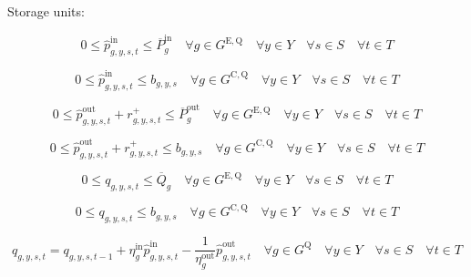 \documentclass{article}
\newcommand{\sStorage}{G^{\mathrm{Q}}}
\newcommand{\sStorageExisting}{G^{\mathrm{E,Q}}}
\newcommand{\sStorageCandidate}{G^{\mathrm{C,Q}}}
\newcommand{\sYears}{Y}
\newcommand{\sScenarios}{S}
\newcommand{\sIntervals}{T}
\newcommand{\iGenerator}{g}
\newcommand{\iYear}{y}
\newcommand{\iScenario}{s}
\newcommand{\iInterval}{t}
\newcommand{\cPowerChargingMax}[1][\iGenerator]{\overline{P}^{\mathrm{in}}_{#1}}
\newcommand{\cPowerDischargingMax}[1][\iGenerator]{\overline{P}^{\mathrm{out}}_{#1}}
\newcommand{\cStorageUnitEnergyMax}[1][\iGenerator]{\overline{Q}_{#1}}
\newcommand{\cStorageUnitEfficiencyCharging}{\eta_{\iGenerator}^{\mathrm{in}}}
\newcommand{\cStorageUnitEfficiencyDischarging}{\eta_{\iGenerator}^{\mathrm{out}}}
\newcommand{\vReserveUp}[1][\iGenerator,\iYear,\iScenario,\iInterval]{r^{+}_{#1}}
\newcommand{\vPowerTotalIn}[1][\iGenerator,\iYear,\iScenario,\iInterval]{\hat{p}^{\mathrm{in}}_{#1}}
\newcommand{\vPowerTotalOut}[1][\iGenerator,\iYear,\iScenario,\iInterval]{\hat{p}^{\mathrm{out}}_{#1}}
\newcommand{\vStorageUnitEnergy}[1][\iGenerator,\iYear,\iScenario,\iInterval]{q_{#1}}
\newcommand{\vInstalledCapacityTotalScenario}[1][\iGenerator,\iYear,\iScenario]{b_{#1}}
\begin{document}
Storage units:

\begin{equation}
0 \leq \vPowerTotalIn \leq \cPowerChargingMax \quad \forall \iGenerator \in \sStorageExisting \quad \forall \iYear \in \sYears \quad \forall \iScenario \in \sScenarios \quad \forall \iInterval \in \sIntervals
\end{equation}

\begin{equation}
0 \leq \vPowerTotalIn \leq \vInstalledCapacityTotalScenario \quad \forall \iGenerator \in \sStorageCandidate \quad \forall \iYear \in \sYears \quad \forall \iScenario \in \sScenarios \quad \forall \iInterval \in \sIntervals
\end{equation}

\begin{equation}
0 \leq \vPowerTotalOut + \vReserveUp \leq \cPowerDischargingMax \quad \forall \iGenerator \in \sStorageExisting \quad \forall \iYear \in \sYears \quad \forall \iScenario \in \sScenarios \quad \forall \iInterval \in \sIntervals
\end{equation}

\begin{equation}
0 \leq \vPowerTotalOut + \vReserveUp \leq \vInstalledCapacityTotalScenario \quad \forall \iGenerator \in \sStorageCandidate \quad \forall \iYear \in \sYears \quad \forall \iScenario \in \sScenarios \quad \forall \iInterval \in \sIntervals
\end{equation}

\begin{equation}
0 \leq \vStorageUnitEnergy \leq \cStorageUnitEnergyMax \quad \forall \iGenerator \in \sStorageExisting \quad \forall \iYear \in \sYears \quad \forall \iScenario \in \sScenarios \quad \forall \iInterval \in \sIntervals
\end{equation}

\begin{equation}
0 \leq \vStorageUnitEnergy \leq \vInstalledCapacityTotalScenario \quad \forall \iGenerator \in \sStorageCandidate \quad \forall \iYear \in \sYears \quad \forall \iScenario \in \sScenarios \quad \forall \iInterval \in \sIntervals
\end{equation}

\begin{equation}
\vStorageUnitEnergy = \vStorageUnitEnergy[\iGenerator,\iYear,\iScenario,\iInterval-1] + \cStorageUnitEfficiencyCharging \vPowerTotalIn - \frac{1}{\cStorageUnitEfficiencyDischarging} \vPowerTotalOut \quad \forall \iGenerator \in \sStorage \quad \forall \iYear \in \sYears \quad \forall \iScenario \in \sScenarios \quad \forall \iInterval \in \sIntervals
\end{equation}
\end{document}
